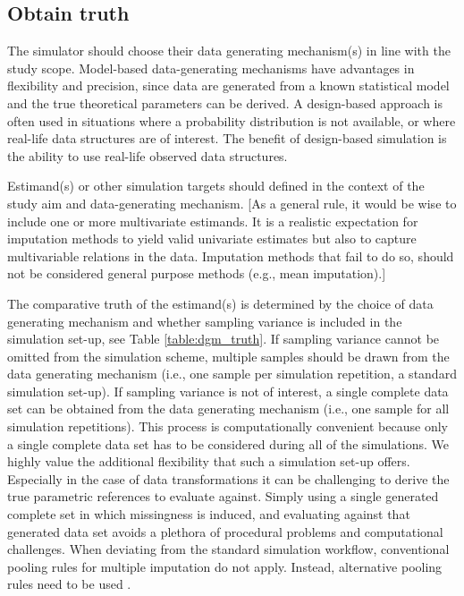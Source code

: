 \documentclass[bimj,fleqn]{w-art}
\begin{document}

\subsection{Obtain truth}


The simulator should choose their data generating mechanism(s) in line with the study scope. Model-based data-generating mechanisms have advantages in flexibility and precision, since data are generated from a known statistical model and the true theoretical parameters can be derived. A design-based approach is often used in situations where a probability distribution is not available, or where real-life data structures are of interest. The benefit of design-based simulation is the ability to use real-life observed data structures. 

Estimand(s) or other simulation targets should defined in the context of the study aim and data-generating mechanism. [As a general rule, it would be wise to include one or more multivariate estimands. It is a realistic expectation for imputation methods to yield valid univariate estimates but also to capture multivariable relations in the data. Imputation methods that fail to do so, should not be considered general purpose methods (e.g., mean imputation).]

The comparative truth of the estimand(s) is determined by the choice of data generating mechanism and whether sampling variance is included in the simulation set-up, see Table \ref{table:dgm_truth}. If sampling variance cannot be omitted from the simulation scheme, multiple samples should be drawn from the data generating mechanism (i.e., one sample per simulation repetition, a standard simulation set-up). If sampling variance is not of interest, a single complete data set can be obtained from the data generating mechanism (i.e., one sample for all simulation repetitions). This process is computationally convenient because only a single complete data set has to be considered during all of the simulations. We highly value the additional flexibility that such a simulation set-up offers. Especially in the case of data transformations it can be challenging to derive the true parametric references to evaluate against. Simply using a single generated complete set in which missingness is induced, and evaluating against that generated data set avoids a plethora of procedural problems and computational challenges.
When deviating from the standard simulation workflow, conventional pooling rules for multiple imputation \citep[cf.][p. 76-77]{rubi87} do not apply. Instead, alternative pooling rules need to be used \citep{raghunathan2003multiple,vink14}.
\end{document}
